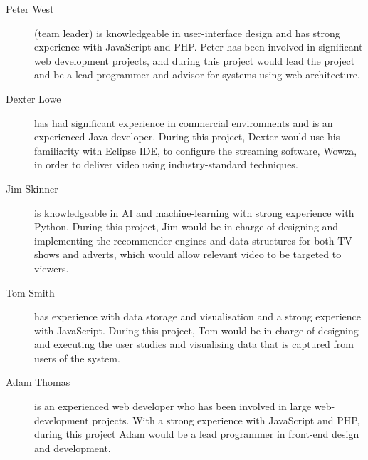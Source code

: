 \begin{description}

\item[Peter West] (team leader) is knowledgeable in user-interface design and has strong experience with JavaScript and PHP. Peter has been involved in significant web development projects, and during this project would lead the project and be a lead programmer and advisor for systems using web architecture.

\item[Dexter Lowe] has had significant experience in commercial environments and is an experienced Java developer. During this project, Dexter would use his familiarity with Eclipse IDE, to configure the streaming software, Wowza, in order to deliver video using industry-standard techniques.

\item[Jim Skinner] is knowledgeable in AI and machine-learning with strong experience with Python. During this project, Jim would be in charge of designing and implementing the recommender engines and data structures for both TV shows and adverts, which would allow relevant video to be targeted to viewers.

\item[Tom Smith] has experience with data storage and visualisation and a strong experience with JavaScript. During this project, Tom would be in charge of designing and executing the user studies and visualising data that is captured from users of the system.

\item[Adam Thomas] is an experienced web developer who has been involved in large web-development projects. With a strong experience with JavaScript and PHP, during this project Adam would be a lead programmer in front-end design and development. 

\end{description}